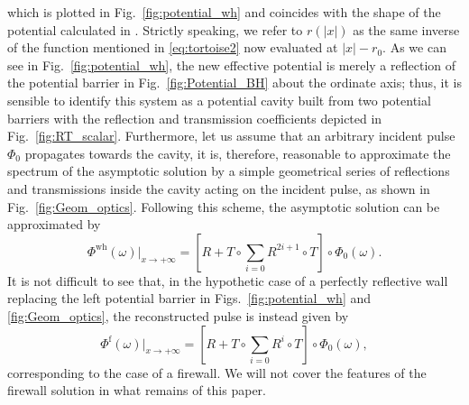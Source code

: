 \documentclass[article,aps,nofootinbib,twocolumn,superscriptaddress]{revtex4-1}
\begin{document}
which is plotted in Fig.~\ref{fig:potential_wh} and coincides with the shape of the potential calculated in \citep{Cardoso:2016oxy}. Strictly speaking, we refer to $r\left(|x|\right)$ as the same inverse of the function mentioned in \eqref{eq:tortoise2} now evaluated at $|x|-r_0$. As we can see in Fig.~\ref{fig:potential_wh}, the new effective potential is merely a reflection of the potential barrier in Fig.~\ref{fig:Potential_BH} about the ordinate axis; thus, it is sensible to identify this system as a potential cavity built from two potential barriers with the reflection and transmission coefficients depicted in Fig.~\ref{fig:RT_scalar}. Furthermore, let us assume that an arbitrary incident pulse $\Phi_0$ propagates towards the cavity, it is, therefore, reasonable to approximate the spectrum of the asymptotic solution by a simple geometrical series of reflections and transmissions inside the cavity acting on the incident pulse, as shown in Fig.~\ref{fig:Geom_optics}. Following this scheme, the asymptotic solution can be approximated by
\begin{equation}
\Phi^{\mathrm{wh}}(\omega)|_{x\rightarrow+\infty}=\left[R+T\circ\sum_{i=0}R^{2i+1}\circ T\right]\circ\Phi_0(\omega).
\label{eq:reconst}
\end{equation}
It is not difficult to see that, in the hypothetic case of a perfectly reflective wall replacing the left potential barrier in Figs.~\ref{fig:potential_wh} and \ref{fig:Geom_optics}, the reconstructed pulse is instead given by 
\begin{equation}
\Phi^{\mathrm{f}}(\omega)|_{x\rightarrow+\infty}=\left[R+T\circ\sum_{i=0}R^i\circ T\right]\circ\Phi_0(\omega),
\label{eq:reconst_firewall}
\end{equation}
corresponding to the case of a firewall. We will not cover the features of the firewall solution in what remains of this paper. 
\end{document}
